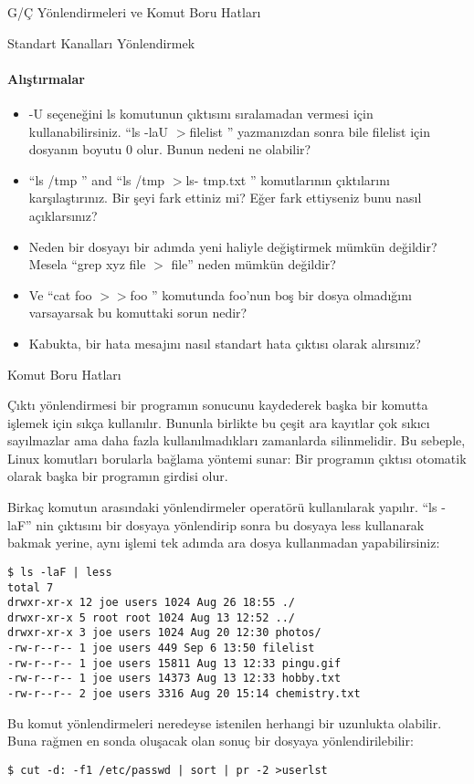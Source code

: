 \begin{section}{G/Ç Yönlendirmeleri ve Komut Boru Hatları}
\begin{subsection}{Standart Kanalları Yönlendirmek}
\paragraph{Alıştırmalar}{
\begin{itemize}
 \item -U seçeneğini ls komutunun çıktısını sıralamadan vermesi için kullanabilirsiniz. “ls -laU $>$filelist ” yazmanızdan sonra bile filelist için dosyanın boyutu 0 olur. Bunun nedeni ne olabilir?
 \item “ls /tmp ” and “ls /tmp $>$ls- tmp.txt ” komutlarının çıktılarını karşılaştırınız. Bir şeyi fark ettiniz mi? Eğer fark ettiyseniz bunu nasıl açıklarsınız? 
 \item Neden bir dosyayı bir adımda yeni haliyle değiştirmek mümkün değildir? Mesela “grep xyz file $>$ file” neden mümkün değildir?
\item Ve “cat foo $>>$foo ” komutunda foo'nun boş bir dosya olmadığını varsayarsak bu komuttaki sorun nedir?
\item Kabukta, bir hata mesajını nasıl standart hata çıktısı olarak alırsınız?
\end{itemize}}
\end{subsection}
\begin{subsection}{Komut Boru Hatları}

Çıktı yönlendirmesi bir programın sonucunu kaydederek başka bir komutta işlemek için sıkça kullanılır. Bununla birlikte bu çeşit ara kayıtlar çok sıkıcı sayılmazlar ama daha fazla kullanılmadıkları zamanlarda silinmelidir. Bu sebeple, Linux komutları borularla bağlama yöntemi sunar: Bir programın çıktısı otomatik olarak başka bir programın girdisi olur.

Birkaç komutun arasındaki yönlendirmeler \textbar  operatörü kullanılarak yapılır.  “ls -laF” nin çıktısını bir dosyaya yönlendirip sonra bu dosyaya less kullanarak bakmak yerine, aynı işlemi tek adımda ara dosya kullanmadan yapabilirsiniz:
\begin{verbatim}
$ ls -laF | less
total 7
drwxr-xr-x 12 joe users 1024 Aug 26 18:55 ./
drwxr-xr-x 5 root root 1024 Aug 13 12:52 ../
drwxr-xr-x 3 joe users 1024 Aug 20 12:30 photos/
-rw-r--r-- 1 joe users 449 Sep 6 13:50 filelist
-rw-r--r-- 1 joe users 15811 Aug 13 12:33 pingu.gif
-rw-r--r-- 1 joe users 14373 Aug 13 12:33 hobby.txt
-rw-r--r-- 2 joe users 3316 Aug 20 15:14 chemistry.txt
\end{verbatim}

Bu komut yönlendirmeleri neredeyse istenilen herhangi bir uzunlukta olabilir. Buna rağmen en sonda oluşacak olan sonuç bir dosyaya yönlendirilebilir:
\begin{verbatim}
$ cut -d: -f1 /etc/passwd | sort | pr -2 >userlst
\end{verbatim}


\end{subsection}
\end{section}
